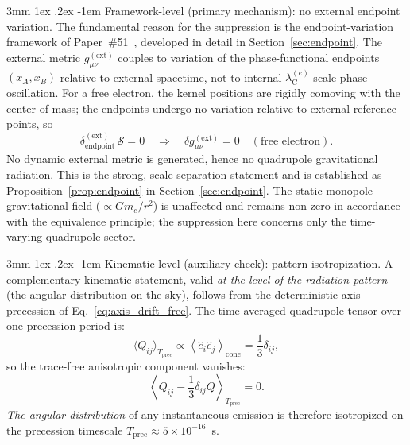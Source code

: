 \documentclass[%
 reprint, amsmath,amssymb, aps, prd, ]{revtex4-2}
\makeatletter
\numberwithin{equation}{section}
\renewcommand\paragraph{%
  \@startsection{paragraph}{4}{\z@}%
    {3mm \@plus 1ex \@minus .2ex}%
    {-1em}%
    {\normalfont\normalsize\itshape}}
\newcommand{\lambdaCe}{\lambda_{\mathrm{C}}^{(e)}}
\makeatother
\begin{document}
\paragraph{Framework-level (primary mechanism): no external endpoint variation.}
The fundamental reason for the suppression is the endpoint-variation framework of Paper~\#51~\cite{hanamura51}, developed in detail in Section~\ref{sec:endpoint}.
The external metric $g_{\mu\nu}^{(\mathrm{ext})}$ couples to variation of the phase-functional endpoints $(x_A, x_B)$ relative to external spacetime, not to internal $\lambdaCe$-scale phase oscillation.
For a free electron, the kernel positions are rigidly comoving with the center of mass; the endpoints undergo no variation relative to external reference points, so
\begin{equation}
\delta_\mathrm{endpoint}^{(\mathrm{ext})}\,\mathcal{S} = 0
\quad \Rightarrow \quad
\delta g_{\mu\nu}^{(\mathrm{ext})} = 0
\quad (\text{free electron}).
\label{eq:free_no_endpoint}
\end{equation}
No dynamic external metric is generated, hence no quadrupole gravitational radiation.
This is the strong, scale-separation statement and is established as Proposition~\ref{prop:endpoint} in Section~\ref{sec:endpoint}.
The static monopole gravitational field ($\propto Gm_e/r^2$) is unaffected and remains non-zero in accordance with the equivalence principle; the suppression here concerns only the time-varying quadrupole sector.

\paragraph{Kinematic-level (auxiliary check): pattern isotropization.}
A complementary kinematic statement, valid \emph{at the level of the radiation pattern} (the angular distribution on the sky), follows from the deterministic axis precession of Eq.~\eqref{eq:axis_drift_free}.
The time-averaged quadrupole tensor over one precession period is:
\begin{equation}
\langle Q_{ij}\rangle_{T_\mathrm{prec}}
\propto \left\langle \hat{e}_i\hat{e}_j \right\rangle_\mathrm{cone}
= \frac{1}{3}\delta_{ij},
\label{eq:cone_avg}
\end{equation}
so the trace-free anisotropic component vanishes:
\begin{equation}
\left\langle Q_{ij} - \frac{1}{3}\delta_{ij}Q \right\rangle_{T_\mathrm{prec}} = 0.
\label{eq:tracefree_avg}
\end{equation}
\emph{The angular distribution} of any instantaneous emission is therefore isotropized on the precession timescale $T_\mathrm{prec} \approx 5\times10^{-16}$~s.
\end{document}
